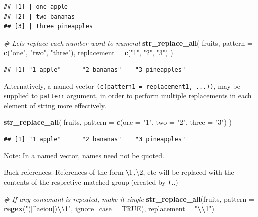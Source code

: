 \documentclass[
]{book}
\newenvironment{Shaded}{\begin{snugshade}}{\end{snugshade}}
\newcommand{\AttributeTok}[1]{\textcolor[rgb]{0.13,0.29,0.53}{#1}}
\newcommand{\CommentTok}[1]{\textcolor[rgb]{0.56,0.35,0.01}{\textit{#1}}}
\newcommand{\ConstantTok}[1]{\textcolor[rgb]{0.56,0.35,0.01}{#1}}
\newcommand{\FunctionTok}[1]{\textcolor[rgb]{0.13,0.29,0.53}{\textbf{#1}}}
\newcommand{\NormalTok}[1]{#1}
\newcommand{\SpecialCharTok}[1]{\textcolor[rgb]{0.81,0.36,0.00}{\textbf{#1}}}
\newcommand{\StringTok}[1]{\textcolor[rgb]{0.31,0.60,0.02}{#1}}
\begin{document}
\begin{verbatim}
## [1] | one apple
## [2] | two bananas
## [3] | three pineapples
\end{verbatim}

\begin{Shaded}
\begin{Highlighting}[]
\CommentTok{\# Let\textquotesingle{}s replace each number word to numeral}
\FunctionTok{str\_replace\_all}\NormalTok{(}
\NormalTok{  fruits,}
  \AttributeTok{pattern =} \FunctionTok{c}\NormalTok{(}\StringTok{"one"}\NormalTok{, }\StringTok{"two"}\NormalTok{, }\StringTok{"three"}\NormalTok{),}
  \AttributeTok{replacement =} \FunctionTok{c}\NormalTok{(}\StringTok{"1"}\NormalTok{, }\StringTok{"2"}\NormalTok{, }\StringTok{"3"}\NormalTok{)}
\NormalTok{)}
\end{Highlighting}
\end{Shaded}

\begin{verbatim}
## [1] "1 apple"      "2 bananas"    "3 pineapples"
\end{verbatim}

Alternatively, a named vector \texttt{(c(pattern1\ =\ replacement1,\ ...))}, may be supplied to \texttt{pattern} argument, in order to perform multiple replacements in each element of string more effectively.

\begin{Shaded}
\begin{Highlighting}[]
\FunctionTok{str\_replace\_all}\NormalTok{(}
\NormalTok{  fruits,}
  \AttributeTok{pattern =} \FunctionTok{c}\NormalTok{(}\AttributeTok{one =} \StringTok{"1"}\NormalTok{, }\AttributeTok{two =} \StringTok{"2"}\NormalTok{, }\AttributeTok{three =} \StringTok{"3"}\NormalTok{)}
\NormalTok{)}
\end{Highlighting}
\end{Shaded}

\begin{verbatim}
## [1] "1 apple"      "2 bananas"    "3 pineapples"
\end{verbatim}

Note: In a named vector, names need not be quoted.

Back-references: References of the form \texttt{⁠\textbackslash{}}1⁠\texttt{,}⁠\textbackslash2⁠, etc will be replaced with the contents of the respective matched group (created by \texttt{⁠(}..)

\begin{Shaded}
\begin{Highlighting}[]
\CommentTok{\# If any consonant is repeated, make it single}
\FunctionTok{str\_replace\_all}\NormalTok{(fruits, }
                \AttributeTok{pattern =} \FunctionTok{regex}\NormalTok{(}\StringTok{"([\^{}aeiou])}\SpecialCharTok{\textbackslash{}\textbackslash{}}\StringTok{1"}\NormalTok{, }\AttributeTok{ignore\_case =} \ConstantTok{TRUE}\NormalTok{),}
                \AttributeTok{replacement =} \StringTok{"}\SpecialCharTok{\textbackslash{}\textbackslash{}}\StringTok{1"}\NormalTok{)}
\end{Highlighting}
\end{Shaded}
\end{document}
